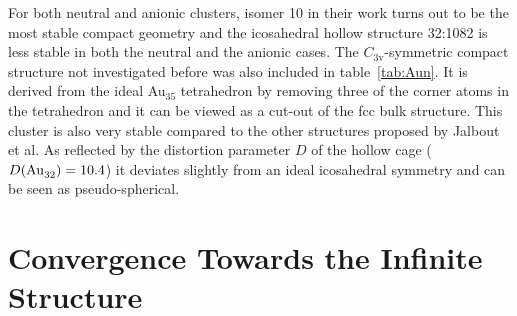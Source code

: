 %
For both neutral and anionic clusters, isomer 10 in their work turns out to be
the most stable compact geometry and the icosahedral hollow structure 32:1082 is
less stable in both the neutral and the anionic cases. The
$C_\mathrm{3v}$-symmetric compact structure not investigated before was also
included in table~\ref{tab:Aun}. It is derived from the ideal Au$_{35}$
tetrahedron by removing three of the corner atoms in the tetrahedron and it can
be viewed as a cut-out of the \ac{fcc} bulk structure. This cluster is also very
stable compared to the other structures proposed by Jalbout et al. As reflected
by the distortion parameter $D$ of the  hollow cage
($D(\ce{Au32})=10.4$) it deviates slightly from an ideal icosahedral symmetry
and can be seen as pseudo-spherical.
  
\section{Convergence Towards the Infinite Structure}

